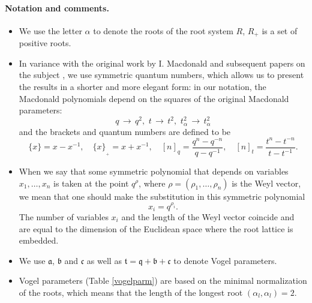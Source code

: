 \documentclass{article}
\begin{document}
\paragraph{Notation and comments.}
\begin{itemize}
\item We use the letter $\alpha$ to denote the roots of the root system $R$, $R_+$ is a set of  positive roots.
\item
In variance with the original work by I. Macdonald \cite{Mac} and subsequent papers on the subject \cite{MacConj,CherednikConj,CherednikDAHA,Koorn},
we use symmetric quantum numbers, which allows us to present the results in a shorter and more elegant form: in our notation, the Macdonald polynomials depend on the squares of the original Macdonald parameters:
\begin{equation}
    q \,\rightarrow \, q^2, \,\, t \,\rightarrow \, t^2,\,\,  t_{\alpha}^2 \,\rightarrow \, t_{\alpha}^2
\end{equation}
and the brackets and quantum numbers are defined to be
\begin{equation}
    \{x\} = x-x^{-1}, \quad \{x\}_{_+}=x+x^{-1}, \quad[n]_q = \frac{q^n-q^{-n}}{q-q^{-1}}, \quad [n]_t = \frac{t^n-t^{-n}}{t-t^{-1}}.
\end{equation}

\item When we say that some symmetric polynomial that depends on variables $x_1, \dots, x_n$ is taken at the point $q^{\rho}$, where $\rho = (\rho_1, \dots,\rho_n)$ is the Weyl vector, we mean that one should make the substitution in this symmetric polynomial
\begin{equation}
    x_i = q^{\rho_i}.
\end{equation}
The number of variables $x_i$ and the length of the Weyl vector coincide and are equal to the dimension of the Euclidean space where the root lattice is embedded.

\item We use $\mathfrak{a}$, $\mathfrak{b}$ and $\mathfrak{c}$ as well as $\mathfrak{t} = \mathfrak{q}+\mathfrak{b}+\mathfrak{c}$ to denote Vogel parameters.

\item Vogel parameters (Table \ref{vogelparm}) are based on the minimal normalization of the roots, which means that the length of the longest root $(\alpha_l,\alpha_l) = 2$.

\end{itemize}
\end{document}
